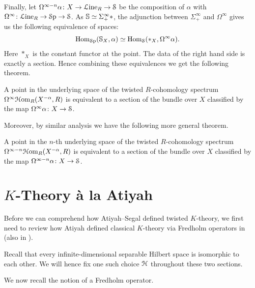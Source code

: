 \documentclass[10pt]{amsart}
\begin{document}
Finally, let $\Omega^{\infty-n} \alpha \colon X \to \mathcal{L}\mathrm{ine}_R \to \mathcal{S}$ be the composition of $\alpha$ with $\Omega^\infty\colon \mathcal{L}\mathrm{ine}_R \to \mathcal{S}\mathrm{p} \to \mathcal{S}$. As $\mathbb{S} \simeq \Sigma^\infty_+ *$, the adjunction between $\Sigma^\infty_+$	and $\Omega^\infty$ gives us the following equivalence of spaces:
\[\mathrm{Hom}_{\mathcal{S}\mathrm{p}}(\mathbb{S}_X,\alpha) \simeq \mathrm{Hom}_{\mathcal{S}}(*_X,\Omega^\infty\alpha).\]
Here $*_X$ is the constant functor at the point. The data of the right hand side is exactly a section. Hence combining these equivalences we get the following theorem.

\begin{theorem}
 A point in the underlying space of the twisted $R$-cohomology spectrum $\Omega^\infty\mathcal{H}\mathrm{om}_R(X^{-\alpha},R)$ is equivalent to a section of the bundle over $X$ classified by the map $\Omega^\infty \alpha \colon X \to \mathcal{S}$.
\end{theorem}

Moreover, by similar analysis we have the following more general theorem.

\begin{theorem} \label{thm:twisted_R_cohomology_section}
 A point in the $n$-th underlying space of the twisted $R$-cohomology spectrum $\Omega^{\infty-n}\mathcal{H}\mathrm{om}_R(X^{-\alpha},R)$ is equivalent to a section of the bundle over $X$ classified by the map $\Omega^{\infty-n} \alpha \colon X \to \mathcal{S}$.
\end{theorem}

\section{\texorpdfstring{$K$}{K}-Theory \texorpdfstring{{\` a}}{a} la Atiyah}
Before we can comprehend how Atiyah--Segal defined twisted $K$-theory, we first need to review how Atiyah defined classical $K$-theory via Fredholm operators in \cite{atiyah1967ktheory} (also in \cite{janich1965fredholm}). 

\begin{remark}
	Recall that every infinite-dimensional separable Hilbert space is isomorphic to each other. We will hence fix one such choice $\mathcal{H}$ throughout these two sections.
\end{remark}


We now recall the notion of a Fredholm operator.
\end{document}
